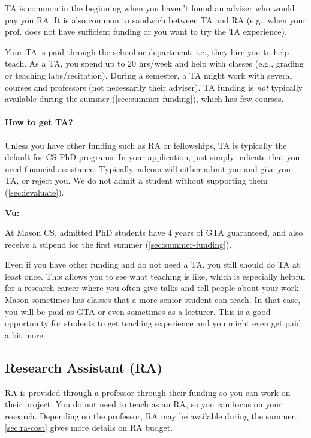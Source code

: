 \documentclass[oneside,11pt,dvipsnames]{book}
\newenvironment{commentbox}[1][]{
  \small
  \begin{mybox}
    {\small \textbf{#1}}
  }{
  \end{mybox}
}
\begin{document}
TA is common in the beginning when you haven't found an adviser who would pay you RA. It is also common to sandwich between TA and RA (e.g., when your prof. does not have sufficient funding or you want to try the TA experience).

Your TA is paid through the school or department, i.e., they hire you to help teach.
As a TA, you spend up to 20 hrs/week and help with classes (e.g., grading or teaching labs/recitation).
During a semester, a TA might work with several courses and professors (not necessarily their adviser).  TA funding is \emph{not} typically available during the summer (\autoref{sec:summer-funding}), which has few courses.

\paragraph{How to get TA?}  Unless you have other funding such as RA or fellowships, TA is typically the default for CS PhD programs. In your application, just simply indicate that you need financial assistance. Typically, adcom will either admit you and give you TA, or reject you. We do not admit a student without supporting them (\autoref{sec:ievaluate}).

\begin{commentbox}[Vu:]
  At Mason CS, admitted PhD students have 4 years of GTA guaranteed, and also receive a stipend for the first summer (\autoref{sec:summer-funding}).
\end{commentbox}

Even if you have other funding and do not need a TA, you still should do TA at least once.  This allows you to see what teaching is like, which is especially helpful for a research career where you often give talks and tell people about your work. Mason sometimes has classes that a more senior student can teach.  In that case, you will be paid as GTA or even sometimes as a lecturer.  This is a good opportunity for students to get teaching experience and you might even get paid a bit more.

\subsection{Research Assistant (RA)}\label{sec:ra}
RA is provided through a professor through their funding so you can work on their project.
You do not need to teach as an RA, so you can focus on your research. Depending on the professor, RA may be available during the summer. \autoref{sec:ra-cost} gives more details on RA budget.
\end{document}
